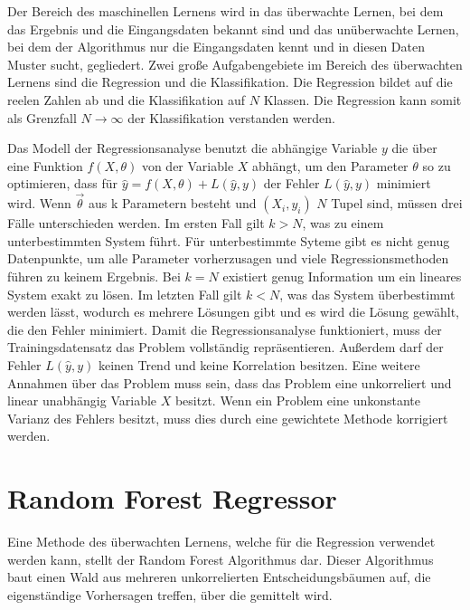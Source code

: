Der Bereich des maschinellen Lernens wird in das überwachte Lernen, bei dem das Ergebnis und die Eingangsdaten bekannt
sind und das unüberwachte Lernen, bei dem der Algorithmus nur die Eingangsdaten kennt und in diesen Daten Muster sucht, gegliedert.
Zwei große Aufgabengebiete im Bereich des überwachten Lernens sind die Regression und die Klassifikation. Die Regression bildet
auf die reelen Zahlen ab und die Klassifikation auf $N$ Klassen.
Die Regression kann somit als Grenzfall $N \to \infty$ der Klassifikation verstanden werden.

Das Modell der Regressionsanalyse benutzt die abhängige Variable $y$ die über eine Funktion $f(X,\theta)$ von der Variable $X$ abhängt, um
den Parameter $\theta$ so zu optimieren, dass für $\hat{y} = f(X,\theta) + L(\hat{y},y)$ der Fehler
$L(\hat{y},y)$ minimiert wird.
Wenn $\vec{\theta}$ aus k Parametern besteht und $(X_i,y_i)$ $N$ Tupel sind, müssen drei Fälle unterschieden werden.
Im ersten Fall gilt $k>N$, was zu einem unterbestimmten System führt.
Für unterbestimmte Syteme gibt es nicht genug Datenpunkte, um alle Parameter vorherzusagen und viele Regressionsmethoden
führen zu keinem Ergebnis.
Bei $k = N$ existiert genug Information um ein lineares System exakt zu lösen.
Im letzten Fall gilt $k<N$, was das System überbestimmt werden lässt, wodurch es mehrere Lösungen gibt und
es wird die Lösung gewählt, die den Fehler minimiert.
Damit die Regressionsanalyse funktioniert, muss der Trainingsdatensatz das Problem vollständig repräsentieren. Außerdem darf der Fehler $L(\hat{y},y)$ keinen Trend
und keine Korrelation besitzen.
Eine weitere Annahmen über das Problem muss sein, dass das Problem eine unkorreliert und linear unabhängig Variable $X$ besitzt.
Wenn ein Problem eine unkonstante Varianz des Fehlers besitzt, muss dies durch eine gewichtete Methode korrigiert werden.

\section{Random Forest Regressor}
\label{sec:RF}

Eine Methode des überwachten Lernens, welche für die Regression verwendet werden kann, stellt der Random Forest Algorithmus dar. Dieser Algorithmus baut
einen Wald aus mehreren unkorrelierten Entscheidungsbäumen auf, die eigenständige Vorhersagen treffen, über die gemittelt wird.

